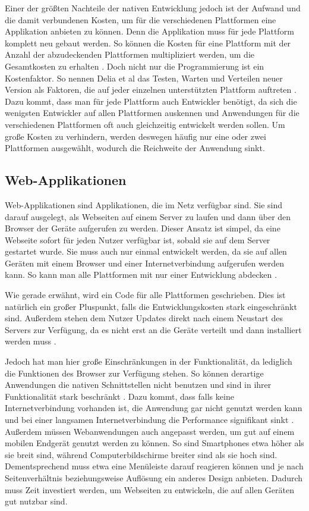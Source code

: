 Einer der größten Nachteile der nativen Entwicklung jedoch ist der Aufwand und die damit verbundenen Kosten, um für die verschiedenen Plattformen eine Applikation anbieten zu können. Denn die Applikation muss für jede Plattform komplett neu gebaut werden. So können die Kosten für eine Plattform mit der Anzahl der abzudeckenden Plattformen multipliziert werden, um die Gesamtkosten zu erhalten \cite{IEEE_Khackouch_Al}. Doch nicht nur die Programmierung ist ein Kostenfaktor. So nennen Delia et al das Testen, Warten und Verteilen neuer Version als Faktoren, die auf jeder einzelnen unterstützten Plattform auftreten \cite{IEEE_development_classes}. Dazu kommt, dass man für jede Plattform auch Entwickler benötigt, da sich die wenigsten Entwickler auf allen Plattformen auskennen und Anwendungen für die verschiedenen Plattformen oft auch gleichzeitig entwickelt werden sollen. Um große Kosten zu verhindern, werden deswegen häufig nur  eine oder zwei Plattformen ausgewählt, wodurch die Reichweite der Anwendung sinkt.

\subsection{Web-Applikationen}
Web-Applikationen sind Applikationen, die im Netz verfügbar sind. Sie sind darauf ausgelegt, als Webseiten auf einem Server zu laufen und dann über den Browser der Geräte aufgerufen zu werden. Dieser Ansatz ist simpel, da eine Webseite sofort für jeden Nutzer verfügbar ist, sobald sie auf dem Server gestartet wurde. Sie muss auch nur einmal entwickelt werden, da sie auf allen Geräten mit einem Browser und einer Internetverbindung aufgerufen werden kann. So kann man alle Plattformen mit nur einer Entwicklung abdecken \cite{IEEE_development_classes}.

Wie gerade erwähnt, wird ein Code für alle Plattformen geschrieben. Dies ist natürlich ein großer Pluspunkt, falls die Entwicklungskosten stark eingeschränkt sind. Außerdem stehen dem Nutzer Updates direkt nach einem Neustart des Servers zur Verfügung, da es nicht erst an die Geräte verteilt und dann installiert werden muss \cite{IEEE_Khackouch_Al}.

Jedoch hat man hier große Einschränkungen in der Funktionalität, da lediglich die Funktionen des Browser zur Verfügung stehen. So können derartige Anwendungen die nativen Schnittstellen nicht benutzen und sind in ihrer Funktionalität stark beschränkt \cite{Phyo}. Dazu kommt, dass falls keine Internetverbindung vorhanden ist, die Anwendung gar nicht genutzt werden kann und bei einer langsamen Internetverbindung die Performance signifikant sinkt \cite{IEEE_Khackouch_Al}. Außerdem müssen Webanwendungen auch angepasst werden, um gut auf einem mobilen Endgerät genutzt werden zu können. So sind Smartphones etwa höher als sie breit sind, während Computerbildschirme breiter sind als sie hoch sind. Dementsprechend muss etwa eine Menüleiste darauf reagieren können und je nach Seitenverhältnis beziehungsweise Auflösung ein anderes Design anbieten. Dadurch muss Zeit investiert werden, um Webseiten zu entwickeln, die auf allen Geräten gut nutzbar sind.

